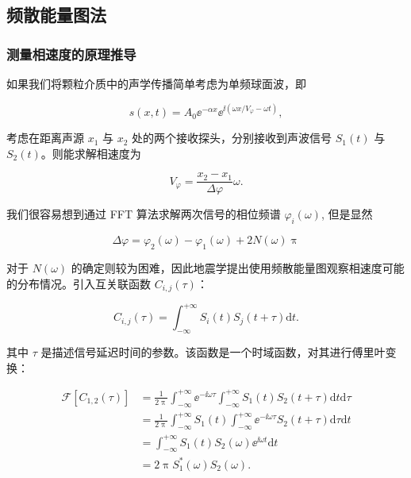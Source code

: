 \subsection{频散能量图法}

\subsubsection{测量相速度的原理推导}

如果我们将颗粒介质中的声学传播简单考虑为单频球面波，即

\begin{equation}
  s(x,t) = A_{0}{\ee}^{-\alpha x}{\ee}^{\ii(\omega x/V_{\varphi}-\omega t)},
  \label{eq:spherical_wave}
\end{equation}

考虑在距离声源 $x_{1}$ 与 $x_{2}$ 处的两个接收探头，分别接收到声波信号 $S_{1}(t)$ 与 $S_{2}(t)$。则能求解相速度为

\begin{equation}
  V_{\varphi} = \frac{x_{2}-x_{1}}{\Delta \varphi}\omega.
\end{equation}

我们很容易想到通过 FFT 算法求解两次信号的相位频谱 $\varphi_{i}(\omega)$, 但是显然

\begin{equation}
  \Delta \varphi = \varphi_{2}(\omega) - \varphi_{1}(\omega) + 2N(\omega)\uppi
\end{equation}

对于 $N(\omega)$ 的确定则较为困难，因此地震学提出使用频散能量图观察相速度可能的分布情况。引入互关联函数 $C_{i,j}(\tau)$：

\begin{equation}
  C_{i,j}(\tau) = \int_{-\infty}^{+\infty}S_{i}(t)S_{j}(t+\tau)\mathrm{d}t.
\end{equation}

其中 $\tau$ 是描述信号延迟时间的参数。该函数是一个时域函数，对其进行傅里叶变换：

\begin{align}
  \mathcal{F}[C_{1,2}(\tau)] &= \frac{1}{2\uppi}\int_{-\infty}^{+\infty}{\ee}^{-\ii\omega\tau}\int_{-\infty}^{+\infty}S_{1}(t)S_{2}(t+\tau)\mathrm{d}t\mathrm{d}\tau \nonumber \\
  &= \frac{1}{2\uppi}\int_{-\infty}^{+\infty}S_{1}(t)\int_{-\infty}^{+\infty}{\ee}^{-\ii\omega\tau}S_{2}(t+\tau)\mathrm{d}\tau\mathrm{d}t \nonumber \\
  &= \int_{-\infty}^{+\infty}S_{1}(t)S_{2}(\omega){\ee}^{\ii\omega t}\mathrm{d}t \nonumber \\
  &= 2\uppi S_{1}^{*}(\omega)S_{2}(\omega).
\end{align}


